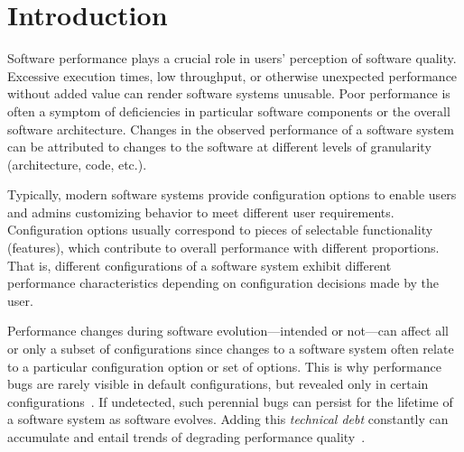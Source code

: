 \documentclass[sigconf, screen]{acmart}
\begin{document}
	
	\maketitle
	
	
	\section{Introduction}
	Software performance plays a crucial role in users' perception of software quality.
	Excessive execution times, low throughput, or otherwise unexpected performance without added value can render software systems unusable.
	Poor performance is often a symptom of deficiencies in particular software components or the overall software architecture.
	Changes in the observed performance of a software system can be attributed to changes to the software at different levels of granularity (architecture, code, etc.).
	
	Typically, modern software systems provide configuration options to enable users and admins  customizing behavior to meet different user requirements.
	Configuration options usually correspond to pieces of selectable functionality (features), which contribute to overall performance with different proportions.
	That is, different configurations of a software system exhibit different performance characteristics depending on configuration decisions made by the user.
	
	Performance changes during software evolution---intended or not---can affect all or only a subset of configurations since changes to a software system often relate to a particular configuration option or set of options.
	This is why performance bugs are rarely visible in default configurations, but revealed only in certain configurations~\cite{hanEmpiricalStudyPerformance2016}.
	If undetected, such perennial bugs can persist for the lifetime of a software system as software evolves.
	Adding this \emph{technical debt} constantly can accumulate and entail trends of degrading performance quality~\cite{guoGeneticAlgorithmOptimized2011}.
	
\end{document}
